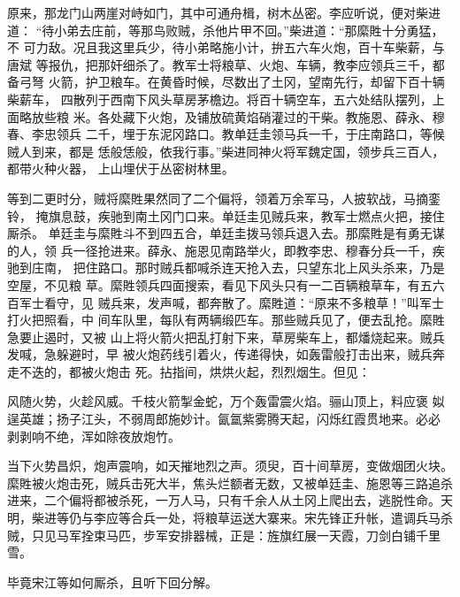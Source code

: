 原来，那龙门山两崖对峙如门，其中可通舟楫，树木丛密。李应听说，便对柴进道：
“待小弟去庄前，等那鸟败贼，杀他片甲不回。”柴进道：“那縻貹十分勇猛，不
可力敌。况且我这里兵少，待小弟略施小计，拚五六车火炮，百十车柴薪，与唐斌
等报仇，把那奸细杀了。教军士将粮草、火炮、车辆，教李应领兵三千，都备弓弩
火箭，护卫粮车。在黄昏时候，尽数出了土冈，望南先行，却留下百十辆柴薪车，
四散列于西南下风头草房茅檐边。将百十辆空车，五六处结队摆列，上面略放些粮
米。各处藏下火炮，及铺放硫黄焰硝灌过的干柴。教施恩、薛永、穆春、李忠领兵
二千，埋于东泥冈路口。教单廷圭领马兵一千，于庄南路口，等候贼人到来，都是
恁般恁般，依我行事。”柴进同神火将军魏定国，领步兵三百人，都带火种火器，
上山埋伏于丛密树林里。

等到二更时分，贼将縻貹果然同了二个偏将，领着万余军马，人披软战，马摘銮铃，
掩旗息鼓，疾驰到南土冈门口来。单廷圭见贼兵来，教军士燃点火把，接住厮杀。
单廷圭与縻貹斗不到四五合，单廷圭拨马领兵退入去。那縻貹是有勇无谋的人，领
兵一径抢进来。薛永、施恩见南路举火，即教李忠、穆春分兵一千，疾驰到庄南，
把住路口。那时贼兵都喊杀连天抢入去，只望东北上风头杀来，乃是空屋，不见粮
草。縻貹领兵四面搜索，看见下风头只有一二百辆粮草车，有五六百军士看守，见
贼兵来，发声喊，都奔散了。縻貹道：“原来不多粮草！”叫军士打火把照看，中
间车队里，每队有两辆缎匹车。那些贼兵见了，便去乱抢。縻貹急要止遏时，又被
山上将火箭火把乱打射下来，草房柴车上，都燔烧起来。贼兵发喊，急躲避时，早
被火炮药线引着火，传递得快，如轰雷般打击出来，贼兵奔走不迭的，都被火炮击
死。拈指间，烘烘火起，烈烈烟生。但见：

风随火势，火趁风威。千枝火箭掣金蛇，万个轰雷震火焰。骊山顶上，料应褒
姒逞英雄；扬子江头，不弱周郎施妙计。氤氲紫雾腾天起，闪烁红霞贯地来。必必
剥剥响不绝，浑如除夜放炮竹。

当下火势昌炽，炮声震响，如天摧地烈之声。须臾，百十间草房，变做烟团火块。
縻貹被火炮击死，贼兵击死大半，焦头烂额者无数，又被单廷圭、施恩等三路追杀
进来，二个偏将都被杀死，一万人马，只有千余人从土冈上爬出去，逃脱性命。天
明，柴进等仍与李应等合兵一处，将粮草运送大寨来。宋先锋正升帐，遣调兵马杀
贼，只见马军拴束马匹，步军安排器械，正是：旌旗红展一天霞，刀剑白铺千里雪。

毕竟宋江等如何厮杀，且听下回分解。